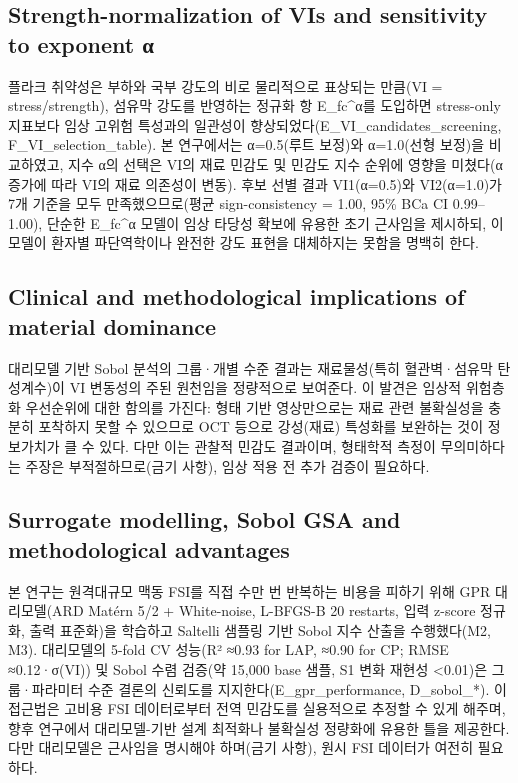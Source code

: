 \documentclass[preprint,12pt]{elsarticle}
\begin{document}
\subsection{Strength-normalization of VIs and sensitivity to exponent α}
플라크 취약성은 부하와 국부 강도의 비로 물리적으로 표상되는 만큼(VI = stress/strength), 섬유막 강도를 반영하는 정규화 항 E\_fc\textasciicircum α를 도입하면 stress-only 지표보다 임상 고위험 특성과의 일관성이 향상되었다(E\_VI\_candidates\_screening, F\_VI\_selection\_table). 본 연구에서는 α=0.5(루트 보정)와 α=1.0(선형 보정)을 비교하였고, 지수 α의 선택은 VI의 재료 민감도 및 민감도 지수 순위에 영향을 미쳤다(α 증가에 따라 VI의 재료 의존성이 변동). 후보 선별 결과 VI1(α=0.5)와 VI2(α=1.0)가 7개 기준을 모두 만족했으므로(평균 sign-consistency = 1.00, 95\% BCa CI 0.99–1.00), 단순한 E\_fc\textasciicircum α 모델이 임상 타당성 확보에 유용한 초기 근사임을 제시하되, 이 모델이 환자별 파단역학이나 완전한 강도 표현을 대체하지는 못함을 명백히 한다.

\subsection{Clinical and methodological implications of material dominance}
대리모델 기반 Sobol 분석의 그룹·개별 수준 결과는 재료물성(특히 혈관벽·섬유막 탄성계수)이 VI 변동성의 주된 원천임을 정량적으로 보여준다. 이 발견은 임상적 위험층화 우선순위에 대한 함의를 가진다: 형태 기반 영상만으로는 재료 관련 불확실성을 충분히 포착하지 못할 수 있으므로 OCT 등으로 강성(재료) 특성화를 보완하는 것이 정보가치가 클 수 있다. 다만 이는 관찰적 민감도 결과이며, 형태학적 측정이 무의미하다는 주장은 부적절하므로(금기 사항), 임상 적용 전 추가 검증이 필요하다.

\subsection{Surrogate modelling, Sobol GSA and methodological advantages}
본 연구는 원격대규모 맥동 FSI를 직접 수만 번 반복하는 비용을 피하기 위해 GPR 대리모델(ARD Matérn 5/2 + White-noise, L-BFGS-B 20 restarts, 입력 z-score 정규화, 출력 표준화)을 학습하고 Saltelli 샘플링 기반 Sobol 지수 산출을 수행했다(M2, M3). 대리모델의 5-fold CV 성능(R² ≈0.93 for LAP, ≈0.90 for CP; RMSE ≈0.12·σ(VI)) 및 Sobol 수렴 검증(약 15,000 base 샘플, S1 변화 재현성 <0.01)은 그룹·파라미터 수준 결론의 신뢰도를 지지한다(E\_gpr\_performance, D\_sobol\_*). 이 접근법은 고비용 FSI 데이터로부터 전역 민감도를 실용적으로 추정할 수 있게 해주며, 향후 연구에서 대리모델-기반 설계 최적화나 불확실성 정량화에 유용한 틀을 제공한다. 다만 대리모델은 근사임을 명시해야 하며(금기 사항), 원시 FSI 데이터가 여전히 필요하다.
\end{document}
